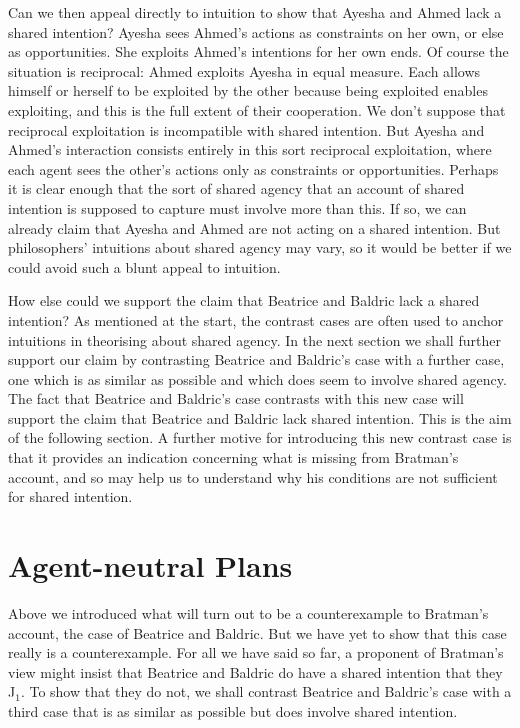 \documentclass[12pt,\papersize]{extarticle}
\begin{document}
Can we then appeal directly to intuition to show that Ayesha and Ahmed lack a shared intention?
Ayesha sees Ahmed's actions as constraints on her own, or else as opportunities.
She exploits Ahmed's intentions for her own ends.
Of course the situation is reciprocal: Ahmed exploits Ayesha in equal measure.
Each allows himself or herself to be exploited by the other because being exploited enables exploiting,
and this is the full extent of their cooperation. 
We don't suppose that reciprocal exploitation is incompatible with shared intention. 
But Ayesha and Ahmed's interaction consists entirely in this sort reciprocal exploitation, where each agent sees the other's actions only as constraints or opportunities.
Perhaps it is clear enough that 
the sort of shared agency that an account of shared intention is supposed to capture must involve more than this. 
If so, we can already claim that Ayesha and Ahmed are not acting on a shared intention.
But philosophers' intuitions about shared agency may vary, so it would be better if we could avoid such a blunt appeal to intuition.

How else could we support the claim that Beatrice and Baldric lack a shared intention? 
As mentioned at the start, 
the contrast cases are often used to anchor intuitions in theorising about shared agency.
In the next section we shall further support our claim by contrasting Beatrice and Baldric's case with a further case, one which is as similar as possible and which does seem to involve shared agency.
The fact that Beatrice and Baldric's case contrasts with this new case will support the claim that Beatrice and Baldric lack shared intention.
This is the aim of the following section.
A further motive for introducing this new contrast case is that it provides an indication concerning what is missing from Bratman's account, and so may help us to understand why his conditions are not sufficient for shared intention.



\section{Agent-neutral Plans}
\label{sec:distributed_plan}

Above we introduced what will turn out to be a counterexample to Bratman's account, the case of Beatrice and Baldric. 
But we have yet to show that this case really is a counterexample. 
For all we have said so far, a proponent of Bratman's view might insist that Beatrice and Baldric do have a shared intention that they J$_1$.
To show that they do not,
we shall contrast Beatrice and Baldric's case with a third case that is as similar as possible but does involve shared intention. 
\end{document}
